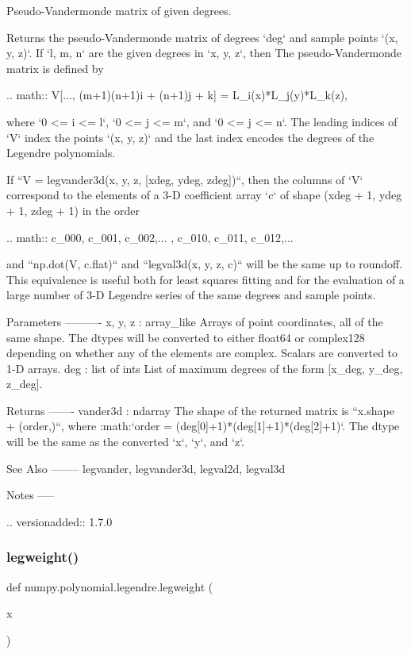 \begin{DoxyVerb}Pseudo-Vandermonde matrix of given degrees.

Returns the pseudo-Vandermonde matrix of degrees `deg` and sample
points `(x, y, z)`. If `l, m, n` are the given degrees in `x, y, z`,
then The pseudo-Vandermonde matrix is defined by

.. math:: V[..., (m+1)(n+1)i + (n+1)j + k] = L_i(x)*L_j(y)*L_k(z),

where `0 <= i <= l`, `0 <= j <= m`, and `0 <= j <= n`.  The leading
indices of `V` index the points `(x, y, z)` and the last index encodes
the degrees of the Legendre polynomials.

If ``V = legvander3d(x, y, z, [xdeg, ydeg, zdeg])``, then the columns
of `V` correspond to the elements of a 3-D coefficient array `c` of
shape (xdeg + 1, ydeg + 1, zdeg + 1) in the order

.. math:: c_{000}, c_{001}, c_{002},... , c_{010}, c_{011}, c_{012},...

and ``np.dot(V, c.flat)`` and ``legval3d(x, y, z, c)`` will be the
same up to roundoff. This equivalence is useful both for least squares
fitting and for the evaluation of a large number of 3-D Legendre
series of the same degrees and sample points.

Parameters
----------
x, y, z : array_like
    Arrays of point coordinates, all of the same shape. The dtypes will
    be converted to either float64 or complex128 depending on whether
    any of the elements are complex. Scalars are converted to 1-D
    arrays.
deg : list of ints
    List of maximum degrees of the form [x_deg, y_deg, z_deg].

Returns
-------
vander3d : ndarray
    The shape of the returned matrix is ``x.shape + (order,)``, where
    :math:`order = (deg[0]+1)*(deg[1]+1)*(deg[2]+1)`.  The dtype will
    be the same as the converted `x`, `y`, and `z`.

See Also
--------
legvander, legvander3d, legval2d, legval3d

Notes
-----

.. versionadded:: 1.7.0\end{DoxyVerb}
 \mbox{\label{namespacenumpy_1_1polynomial_1_1legendre_a7975d5e8863f61429fa60dc1a16eff98}} 
\subsubsection{\texorpdfstring{legweight()}{legweight()}}
{\footnotesize\ttfamily def numpy.\+polynomial.\+legendre.\+legweight (\begin{DoxyParamCaption}\item[{}]{x }\end{DoxyParamCaption})}

